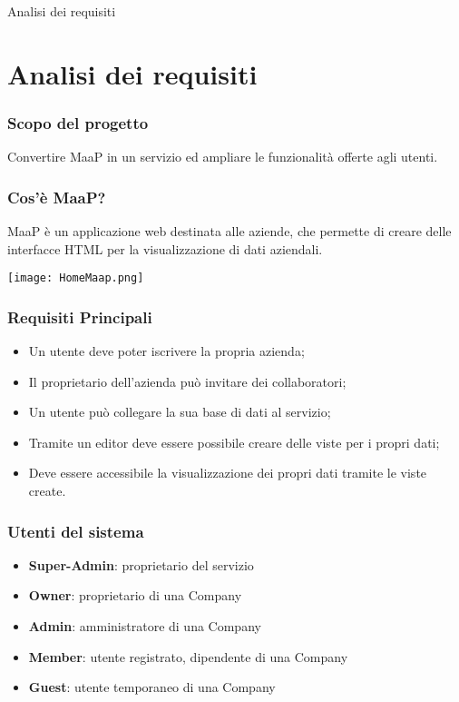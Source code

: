 \begin{frame}

\begin{center}
    \huge Analisi dei requisiti
\end{center}

\end{frame}

\section{Analisi dei requisiti}
\begin{frame}
  \frametitle{Scopo del progetto}

  \begin{center}
    Convertire MaaP in un servizio ed ampliare le funzionalità offerte agli utenti.
  \end{center}
\end{frame}

\begin{frame}
  \frametitle{Cos'è MaaP?}

  MaaP è un applicazione web destinata alle aziende, che permette di creare delle interfacce HTML per la visualizzazione di dati aziendali.

   \texttt{[image: HomeMaap.png]}
  
\end{frame}

\begin{frame}
  \frametitle{Requisiti Principali}

  \begin{itemize}
  \item Un utente deve poter iscrivere la propria azienda;
  \item Il proprietario dell'azienda può invitare dei collaboratori;
  \item Un utente può collegare la sua base di dati al servizio;
  \item Tramite un editor deve essere possibile creare delle viste per i propri dati;
  \item Deve essere accessibile la visualizzazione dei propri dati tramite le viste create.
  \end{itemize}
\end{frame}


\begin{frame}
  \frametitle{Utenti del sistema}

  \begin{itemize}
  \item \textbf{Super-Admin}: proprietario del servizio
  \item \textbf{Owner}: proprietario di una Company
  \item \textbf{Admin}: amministratore di una Company
  \item \textbf{Member}: utente registrato, dipendente di una Company
  \item \textbf{Guest}: utente temporaneo di una Company
  \end{itemize}

\end{frame}

